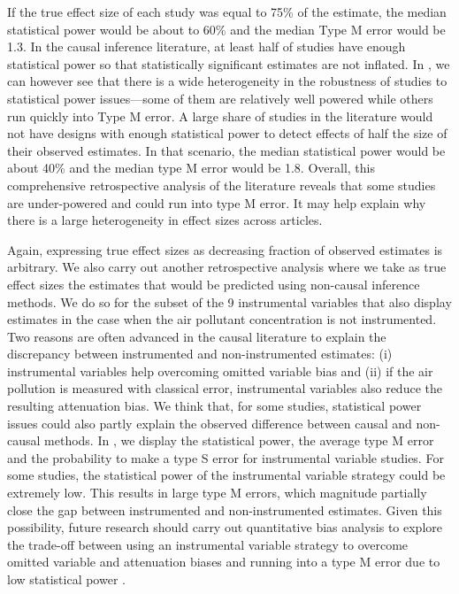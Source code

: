 \documentclass[12pt]{article}
\begin{document}
        If the true effect size of each study was equal to 75\% of the estimate, the median statistical power would be about to 60\% and the median Type M error would be 1.3. In the causal inference literature, at least half of studies have enough statistical power so that statistically significant estimates are not inflated. In , we can however see that there is a wide heterogeneity in the robustness of studies to statistical power issues---some of them are relatively well powered while others run quickly into Type M error. A large share of studies in the literature would not have designs with enough statistical power to detect effects of half the size of their observed estimates. In that scenario, the median statistical power would be about 40\% and the median type M error would be 1.8. Overall, this comprehensive retrospective analysis of the literature reveals that some studies are under-powered and could run into type M error. It may help explain why there is a large heterogeneity in effect sizes across articles. 
    
        Again, expressing true effect sizes as decreasing fraction of observed estimates is arbitrary. We also carry out another retrospective analysis where we take as true effect sizes the estimates that would be predicted using non-causal inference methods. We do so for the subset of the 9 instrumental variables that also display estimates in the case when the air pollutant concentration is not instrumented. Two reasons are often advanced in the causal literature to explain the discrepancy between instrumented and non-instrumented estimates: (i) instrumental variables help overcoming omitted variable bias and (ii) if the air pollution is measured with classical error, instrumental variables also reduce the resulting attenuation bias. We think that, for some studies, statistical power issues could also partly explain the observed difference between causal and non-causal methods. In , we display the statistical power, the average type M error and the probability to make a type S error for instrumental variable studies. For some studies, the statistical power of the instrumental variable strategy could be extremely low. This results in large type M errors, which magnitude partially close the gap between instrumented and non-instrumented estimates. Given this possibility, future research should carry out quantitative bias analysis to explore the trade-off between using an instrumental variable strategy to overcome omitted variable and attenuation biases and running into a type M error due to low statistical power \citep{rosenbaum2010design, dorie2016flexible, vanderweele2017sensitivity, cinelli2020making}.
    
\end{document}

